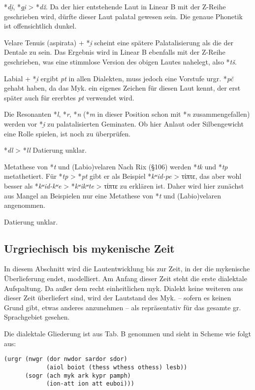 \documentclass[12pt,a4paper,normalheadings]{scrartcl}
\newcounter{para}
\newcommand{\mypara}[1]{\vspace{1em}\par\noindent\refstepcounter{para}%
\textbf{\textsf{\thepara}}\enspace\textsf{#1}\quad}
\def\rek#1{*\textit{#1}}
\def\bel#1{\textit{#1}}
\begin{document}
\rek{di̯}, \rek{gi̯} > \rek{dž}.
Da der hier entstehende Laut in Linear B mit der Z-Reihe geschrieben wird,
dürfte dieser Laut palatal gewesen sein.
Die genaue Phonetik ist offensichtlich dunkel.

Velare Tenuis (aspirata) + \rek{i̯} scheint eine spätere Palatalisierung
als die der Dentale zu sein.
Das Ergebnis wird in Linear B ebenfalls mit der Z-Reihe geschrieben,
was eine stimmlose Version des obigen Lautes nahelegt,
also \rek{tš}.

Labial + \rek{i̯} ergibt \bel{pt} in allen Dialekten,
muss jedoch eine Vorstufe urgr. \rek{pč} gehabt haben,
da das Myk. ein eigenes Zeichen für diesen Laut kennt,
der erst später auch für ererbtes \bel{pt} verwendet wird.

Die Resonanten \rek{l}, \rek{r}, \rek{n}
(\rek{m} in dieser Position schon mit \rek{n} zusammengefallen)
werden vor \rek{i̯} zu palatalisierten Geminaten.
Ob hier Anlaut oder Silbengewicht eine Rolle spielen, ist noch zu überprüfen.

\mypara{\rek{dl} > \rek{ll}}
Datierung unklar.

\mypara{Metathese von \rek{t} und (Labio)velaren}
Nach Rix (§106) werden \rek{tk} und \rek{tp} metathetiert.
Für \rek{tp} > \rek{pt} gibt er als Beispiel \rek{kʷid-pe} > τίπτε,
das aber wohl besser als \rek{kʷid-kʷe} > \rek{kʷikʷte} > τίπτε zu erklären ist.
Daher wird hier zunächst aus Mangel an Beispielen nur eine Metathese von
\rek{t} und (Labio)velaren angenommen.

Datierung unklar.

\subsection{Urgriechisch bis mykenische Zeit}

In diesem Abschnitt wird die Lautentwicklung bis zur Zeit,
in der die mykenische Überlieferung endet, modelliert.
Am Anfang dieser Zeit steht die erste dialektale Aufspaltung.
Da außer dem recht einheitlichen myk. Dialekt keine weiteren aus dieser
Zeit überliefert sind,
wird der Lautstand des Myk.
-- sofern es keinen Grund gibt, etwas anderes anzunehmen --
als repräsentativ für das gesamte gr. Sprachgebiet gesehen.

Die dialektale Gliederung ist aus \cite{bart_frueh} Tab. B genommen
und sieht in Scheme wie folgt aus:
\begin{verbatim}
(urgr (nwgr (dor nwdor sardor sdor)
            (aiol boiot (thess wthess othess) lesb))
      (sogr (ach myk ark kypr pamph)
            (ion-att ion att euboi)))
\end{verbatim}
\end{document}
